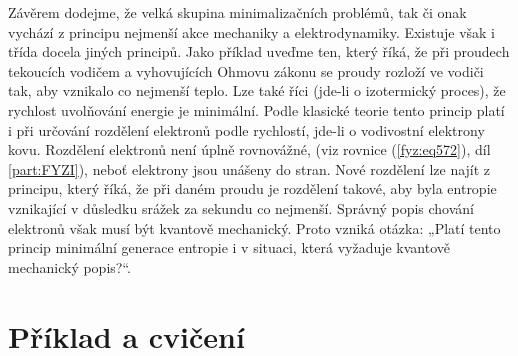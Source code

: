     Závěrem dodejme, že velká skupina minimalizačních problémů, tak či onak vychází z principu
    nejmenší akce mechaniky a elektrodynamiky. Existuje však i třída docela jiných principů. Jako
    příklad uveďme ten, který říká, že při proudech tekoucích vodičem a vyhovujících Ohmovu zákonu
    se proudy rozloží ve vodiči tak, aby vznikalo co nejmenší teplo. Lze také říci (jde-li o
    izotermický proces), že rychlost uvolňování energie je minimální. Podle klasické teorie tento
    princip platí i při určování rozdělení elektronů podle rychlostí, jde-li o vodivostní elektrony
    kovu. Rozdělení elektronů není úplně rovnovážné, (viz rovnice (\ref{fyz:eq572}), díl
    \ref{part:FYZI}), neboť elektrony jsou unášeny do stran. Nové rozdělení lze najít z principu,
    který říká, že při daném proudu je rozdělení takové, aby byla entropie vznikající v důsledku
    srážek za sekundu co nejmenší. Správný popis chování elektronů však musí být kvantově
    mechanický. Proto vzniká otázka: „Platí tento princip minimální generace entropie i v situaci,
    která vyžaduje kvantově mechanický popis?“.

  \section{Příklad a cvičení}\label{fyz:IIchapXIXsecII}

